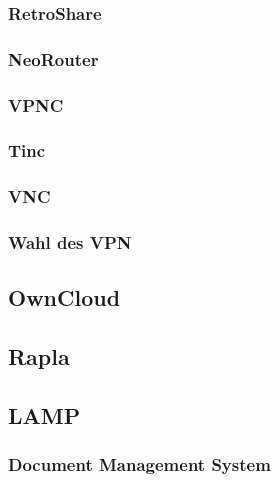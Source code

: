 \subsubsection{RetroShare}

\subsubsection{NeoRouter}

\subsubsection{VPNC}

\subsubsection{Tinc}

\subsubsection{VNC}

\subsubsection{Wahl des VPN}

\subsection{OwnCloud}

\subsection{Rapla}

\subsection{LAMP}
\subsubsection{Document Management System}

